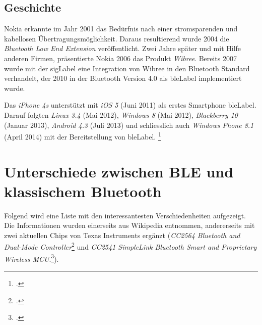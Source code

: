 \subsection{Geschichte}
Nokia erkannte im Jahr 2001 das Bedürfnis nach einer stromsparenden und kabellosen Übertragungsmöglichkeit.
Daraus resultierend wurde 2004 die \textit{Bluetooth Low End Extension} veröffentlicht.
Zwei Jahre später und mit Hilfe anderen Firmen, präsentierte Nokia 2006 das Produkt \textit{Wibree}.
Bereits 2007 wurde mit der \gls{sigLabel} eine Integration von Wibree in den Bluetooth Standard verhandelt, der 2010 in der Bluetooth Version 4.0 als \gls{bleLabel} implementiert wurde.

Das \textit{iPhone 4s} unterstützt mit \textit{iOS 5} (Juni 2011) als erstes Smartphone \gls{bleLabel}.
Darauf folgten \textit{Linux 3.4} (Mai 2012), \textit{Windows 8} (Mai 2012), \textit{Blackberry 10} (Januar 2013), \textit{Android 4.3} (Juli 2013) und schliesslich auch \textit{Windows Phone 8.1} (April 2014) mit der Bereitstellung von \gls{bleLabel}.
\footcite{Bluetooth_low_energy_Wikipedia_2015-04-17}


\section{Unterschiede zwischen BLE und klassischem Bluetooth}

Folgend wird eine Liste mit den interessantesten Verschiedenheiten aufgezeigt.
Die Informationen wurden einerseits aus Wikipedia entnommen, andererseits mit zwei aktuellen Chips von Texas Instruments ergänzt
(\textit{CC2564 Bluetooth and Dual-Mode Controller}\footcite{CC2564_DualMode_2015-05-08} und \textit{CC2541 SimpleLink Bluetooth Smart and Proprietary Wireless MCU}.\footcite{CC2541_BLE_2015-05-08}).

